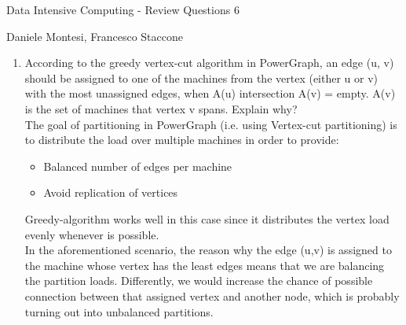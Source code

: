 \documentclass[]{report}
\begin{document}
\begin{center}
 {\Large Data Intensive Computing - Review Questions 6}
\end{center}
\begin{center}
 {\small Daniele Montesi, Francesco Staccone}
\end{center}
\vspace{1cm}
\justify
\begin{enumerate}
 \item According to the greedy vertex-cut algorithm in PowerGraph, an edge (u, v) should be assigned to one of the machines from the vertex (either u or v) with the most unassigned edges, when A(u) intersection A(v) = empty. A(v) is the set of machines that vertex v spans. Explain why? \\
 
 The goal of partitioning in PowerGraph (i.e. using Vertex-cut partitioning) is to distribute the load over multiple machines in order to provide:
 \begin{itemize}
     \item Balanced number of edges per machine
    \item Avoid replication of vertices
 \end{itemize}
 Greedy-algorithm works well in this case since it distributes the vertex load evenly whenever is possible.\\
 In the aforementioned scenario, the reason why the edge (u,v) is assigned to the machine whose vertex has the least edges means that we are balancing the partition loads. Differently, we would increase the chance of possible connection between that assigned vertex and another node, which is probably turning out into unbalanced partitions. 
 

\end{enumerate}
\end{document}
